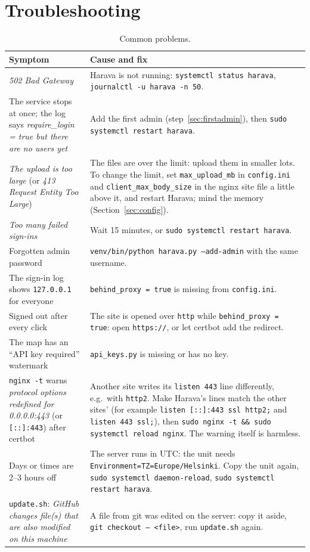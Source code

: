 \documentclass[10pt,a4paper]{article}
\begin{document}
\section{Troubleshooting}\label{sec:trouble}
\begin{table}[H]\small\centering
\caption{Common problems.}
\begin{tabularx}{\textwidth}{>{\raggedright}p{4.4cm}X}
\toprule
\textbf{Symptom} & \textbf{Cause and fix}\\
\midrule
\emph{502 Bad Gateway} & Harava is not running: \texttt{systemctl status harava}, \texttt{journalctl -u harava -n 50}.\\
The service stops at once; the log says \emph{require\_login = true but there are no users yet} & Add the first admin (step~\ref{sec:firstadmin}), then \texttt{sudo systemctl restart harava}.\\
\emph{The upload is too large} (or \emph{413 Request Entity Too Large}) & The files are over the limit: upload them in smaller lots. To change the limit, set \texttt{max\_upload\_mb} in \texttt{config.ini} and \texttt{client\_max\_body\_size} in the nginx site file a little above it, and restart Harava; mind the memory (Section~\ref{sec:config}).\\
\emph{Too many failed sign-ins} & Wait 15 minutes, or \texttt{sudo systemctl restart harava}.\\
Forgotten admin password & \texttt{venv/bin/python harava.py --add-admin} with the same username.\\
The sign-in log shows \texttt{127.0.0.1} for everyone & \texttt{behind\_proxy = true} is missing from \texttt{config.ini}.\\
Signed out after every click & The site is opened over \texttt{http} while \texttt{behind\_proxy = true}: open \texttt{https://}, or let certbot add the redirect.\\
The map has an ``API key required'' watermark & \texttt{api\_keys.py} is missing or has no key.\\
\texttt{nginx -t} warns \emph{protocol options redefined for 0.0.0.0:443} (or \texttt{[::]:443}) after certbot & Another site writes its \texttt{listen 443} line differently, e.g.\ with \texttt{http2}. Make Harava's lines match the other sites' (for example \texttt{listen [::]:443 ssl http2;} and \texttt{listen 443 ssl;}), then \texttt{sudo nginx -t \&\& sudo systemctl reload nginx}. The warning itself is harmless.\\
Days or times are 2--3 hours off & The server runs in UTC: the unit needs \texttt{Environment=TZ=Europe/Helsinki}. Copy the unit again, \texttt{sudo systemctl daemon-reload}, \texttt{sudo systemctl restart harava}.\\
\texttt{update.sh}: \emph{GitHub changes file(s) that are also modified on this machine} & A file from git was edited on the server: copy it aside, \texttt{git checkout -- <file>}, run \texttt{update.sh} again.\\
\bottomrule
\end{tabularx}
\end{table}
\end{document}
